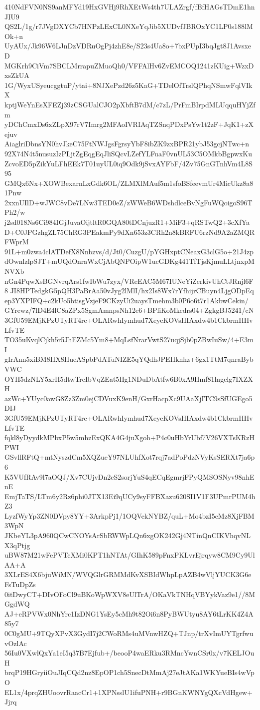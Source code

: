 410NdFVN0NS9anMFYd19HxGVHj9RhXEtWs4th7ULAZrgf/fBfHAGsTDmE1hnJIU9
QS2L/1g/r7JVgDXYCb7HNPzLExCL0NXeYqJib5XUDvfJBROxYC1LP0s188lMOk+n
UyAUx/Jk96W6LJnDzVDRuOgPj4zhE8e/S23s4Ua8o+7bxPUpI3bqJgt8J1AvsxeD
MGKrh9CiVm7SBCLMrrapuZMuoQh0/VFFAlHv6ZvEMCOQ1241zKUig+WzxDxsZkUA
1G/WyxUSyeucggtuP/ytai+8NJXePzd26z5KaG+TDelOfTrslQPhqNSmwFqlVIkX
kptjWeYnEsXFEZj39zCSGUalCJO2pXbftB7dM/c7zL/PrFmBIrpdMLUqquHYjZfm
yDChCmxDs6xZLpX97rV7Imrg2MFAoIVRIAqTZSnqPDxPsYw1t2zF+JqK1+zXejuv
AiaglriDbnsYN0hvJkeC75FtNWJgsFgrsyYbF8ibZK9zxBPR21ybJ53gcjNTwc+n
92X74N4t5nusuzIzPLjtZgEqgEqJliSQcvLZefYLFuaF0vnUL53C5OMkbBgpwxKu
ZcvoED5pZikYuLFhEEk7T01uyUL0iq9Odk9jSvxAYFbF/4Zv75GnGTnhVm4L8S95
GMQx6Nx+XOWBexarnLxGdk6OL/ZLMXlMAuf5m1sfoBSfeevmUr4MicUkz8a81Pnw
2xxnUIlD+wJWC8vDe7LNw3TED0eZ/zWWeB6WDshdlceBvNgFuWQoigoS96TPh2/w
j2sd018Ns6Ci984IGjJuvaOijtltR0GQA80tDCnjuzR1+MiF3+qRSTwQ2+3cXfYa
D+C0JPGzhgZL75ChRG3PEakmPy9dXn653z3CRh2n8kBRFU6rzNd9A2aZMQRFWprM
91L+m0zwa4clATDefX8Nnbzvs/d/Jt0/CuzgU/pYGHxptCNeaxG3clG5o+21J4zp
dOwnlzlpSJT+mUQdOnraWxCjAbQNPOipW1ucGDKg441TfTjsKjmuLLtjnxpMNVXb
nGn4PqwXsBGNvrqArs1fwIbWu7zyx/VReEAC5M67IUNeYiZerkivUhCtJRnjl6F8
JI8HPTedgkG5pQH3PaBrAa50vJyg2lMlI/hx2Is8Wx7rYfhijrCBuyn4LjgODpEq
ep3YXPIFQ+c2kUo5btisgVzjeF9CKzyUi2uaysTmehm3b0P6o6t7r1AkbwCekin/
GYrewz/7lD4E4lC8aZPx5SgmAmnpsNh12e6+BPfiKoMkcdrs04+ZgkgBJ5241/cN
3GfU59EMjKPzUTyRT4re+OLARwhIymhud7XeyeKOVsHIAxdw4b1CkbrmHHvLfvTE
TO35uKvqlCjkh5r5JhEZMc5Ym8+MqLsfNrarVwtS27uqjSjb0pZBwIuSw/4+E3mI
gIrAnn5xiBM8HX8HueASpbPdATuNIZE5qYQdhJPEHknhz+6gx1TtM7qnraBybVWC
OYH5dzNLY5xrH5dtwTreIbVqZEat5Hg1NDuDbAtfw6B0xA9Hmf81lngelg7IXZXH
azWc+YUyc0awG8Zz3Zm0ejCDVuxK9enH/GxrHacpXc9UAaXjITC9sSfUGEgo5DIJ
3GfU59EMjKPzUTyRT4re+OLARwhIymhud7XeyeKOVsHIAxdw4b1CkbrmHHvLfvTE
fqkl8yDyydkMPbxP5w5mhzExQKA4G4juXgoh+P4c0uHbYrUbf7V26VXTsKRzHPWI
GSvllRFtQ+mtNyszdCm5XQZueY97NLUhfXot7rqj7adPoPdzNVyKsSERXt7ja6p6
K5VUfRAv9l7aOQJ/Xv7CUjvDn2cS2sorjYuS4qECqEgmrjFPyQMSOSNyv98nhEnE
EmjTaTS/LTm6y2Rz6phi0JTX13Ei9qUCy9syFFBXazu620SI1V1F3UPmrPUM4hZ3
LyzfWyYp3ZN0DVpy8YY+3ArkpPj1/1OQVekNYBZ/quL+Mo4bzI5eMz8XjFBM3WpN
JKbeYL3pA960QCwCNOYsArSbRWWpLQn6xgOK242Gj4NTinQnCIKVhqvNLX3qPtjg
uBW87M21wFePVTcXMi0KPT1hNTAt/GIhK589pFnxPKLvrEjrqyw8CM9Cy9UlAA+A
3XLrES4X6bjuWiMN/WVQGlrGRMMdKvXSBIdWhpLpAZB4wVljYUCK3G6eFsTuDpZs
0itDwyCT+DIvOFoCl9uBKoWpWXV8eUlTrA/OKaVkTNHqVBYykVaz9e1//8MGgdWQ
AJ+eRPVWx0NhYrc1IzDNG1YsEy5cMh9t82Oi6n8PyBWUtyu8AY6tLrKK4Z4A85y7
0C0gMU+9TQyXPvX3GydI7j2CWoRMs4uMVnwHZQ+TJnp/trXvImUYTgrfwuvOzlAc
56Iu0VXwlQxYa1eI5q37B7Ejfub+/beooP4waERku3RMncYwnCSr0x/v7KELJOuH
brqP19HGryiiOuJIqCQd2nz8EpOP1ch5SnecDtMmAj27eJtAKa1WKYueBIs4wVpO
EL1x/4prqZHUoovrRaacCr1+1XPNsslU1ifuPNH+r9BGnKWNYgQXcVdHgew+Jjrq
